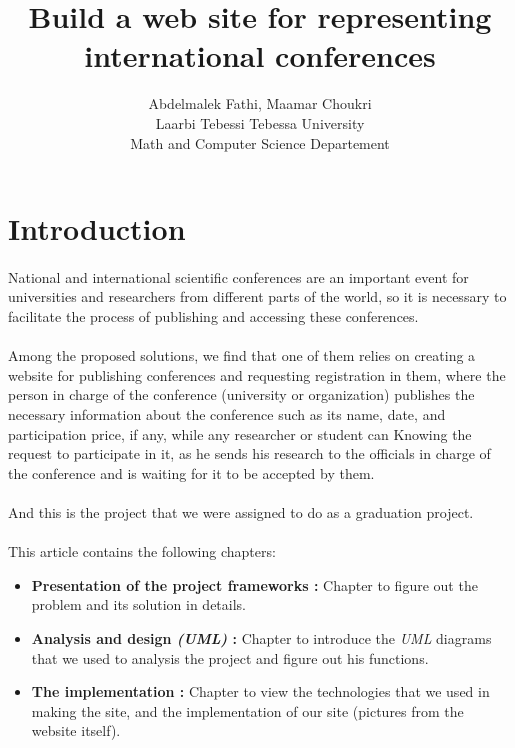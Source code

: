 \documentclass{article}
\author{Abdelmalek Fathi, Maamar Choukri\\
Laarbi Tebessi Tebessa University\\
Math and Computer Science Departement}
\title{Build a web site for representing international conferences}
\date{}
\begin{document}
	\maketitle
	\clearpage
	\tableofcontents
	\clearpage
	\section{Introduction}
	\paragraph{}
	National and international scientific conferences are an important event for universities and researchers from different parts of the world, so it is necessary to facilitate the process of publishing and accessing these conferences.
	\paragraph{}
	Among the proposed solutions, we find that one of them relies on creating a website for publishing conferences and requesting registration in them, where the person in charge of the conference (university or organization) publishes the necessary information about the conference such as its name, date, and participation price, if any, while any researcher or student can Knowing the request to participate in it, as he sends his research to the officials in charge of the conference and is waiting for it to be accepted by them.
	\paragraph{}
	And this is the project that we were assigned to do as a graduation project.
	\paragraph{}
	This article contains the following chapters:
	\begin{itemize}
		
		\item \textbf{Presentation of the project frameworks :}
		Chapter to figure out the problem and its solution in details.
		
		\item \textbf{Analysis and design \textit{(UML)} :}
		Chapter to introduce the \textit{UML} diagrams that we used to analysis the project and figure out his functions.
		
		\item \textbf{The implementation :}
		Chapter to view  the technologies that we used in making the site, and the implementation of our site (pictures from the website itself).
		
	\end{itemize}
	\clearpage
\end{document}
